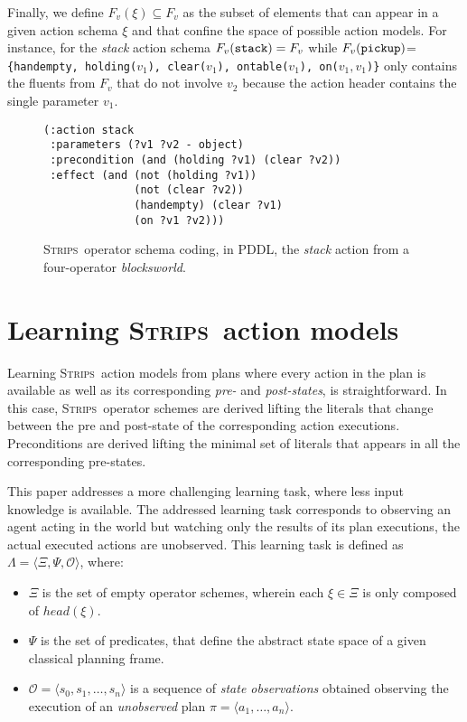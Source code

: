 \documentclass{article}
\newcommand{\tup}[1]{{\langle #1 \rangle}}
\newcommand{\strips}{\textsc{Strips}}     %
\begin{document}
Finally, we define $F_v(\xi)\subseteq F_v$ as the subset of elements that can appear in a given action schema $\xi$ and that confine the space of possible action models. For instance, for the {\em stack} action schema $F_v({\tt stack})=F_v$ while $F_v({\tt pickup})$={\small\tt\{handempty, holding($v_1$), clear($v_1$), ontable($v_1$), on($v_1,v_1$)\}} only contains the fluents from $F_v$ that do not involve $v_2$ because the action header contains the single parameter $v_1$.

\begin{figure}
\begin{footnotesize}
\begin{verbatim}
(:action stack
 :parameters (?v1 ?v2 - object)
 :precondition (and (holding ?v1) (clear ?v2))
 :effect (and (not (holding ?v1)) 
              (not (clear ?v2))
              (handempty) (clear ?v1) 
              (on ?v1 ?v2)))
\end{verbatim}
\end{footnotesize}
 \caption{\small \strips\ operator schema coding, in PDDL, the {\em stack} action from a four-operator {\em blocksworld}.}
\label{fig:stack}
\end{figure}


\section{Learning \strips\ action models}
Learning \strips\ action models from plans where every action in the plan is available as well as its corresponding {\em pre-} and {\em post-states}, is straightforward. In this case, \strips\ operator schemes are derived lifting the literals that change between the pre and post-state of the corresponding action executions. Preconditions are derived lifting the minimal set of literals that appears in all the corresponding pre-states.

This paper addresses a more challenging learning task, where less input knowledge is available. The addressed learning task corresponds to observing an agent acting in the world but watching only the results of its plan executions, the actual executed actions are unobserved. This learning task is defined as $\Lambda=\tup{\Xi,\Psi,\mathcal{O}}$, where:
\begin{itemize}
\item $\Xi$ is the set of empty operator schemes, wherein each $\xi\in\Xi$ is only composed of $head(\xi)$.
\item $\Psi$ is the set of predicates, that define the abstract state space of a given classical planning frame.
\item $\mathcal{O}=\tup{s_0,s_1,\ldots,s_{n}}$ is a sequence of {\em state observations} obtained observing the execution of an {\em unobserved} plan $\pi=\tup{a_1, \ldots, a_n}$.
\end{itemize}
\end{document}
